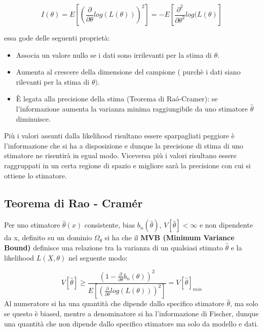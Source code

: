 \begin{equation*}
		I(\theta) = E[(\frac{\partial}{\partial \theta}log(L(\theta)))^2] = -E[\frac{\partial^2}{\partial\theta^2}log(L(\theta)]
\end{equation*}

\noindent essa gode delle seguenti propriet\`{a}:

\begin{itemize}
	\item Associa un valore nullo se i dati sono irrilevanti per la stima di $\theta$.
	\item Aumenta al crescere della dimensione del campione ( purch\`{e} i dati siano rilevanti per la stima di $\theta)$.
	\item \`{E} legata alla precisione della stima (Teorema di Ra\'{o}-Cramer): se l'informazione aumenta la varianza minima raggiungibile da uno stimatore $\hat{\theta}$ diminuisce.
\end{itemize}

\noindent Pi\`{u} i valori assunti dalla likelihood risultano essere sparpagliati peggiore \`{e} l'informazione che si ha a disposizione e dunque la precisione di stima di uno stimatore ne risentir\`{a} in egual modo. Viceversa pi\`{u} i valori risultano essere raggruppati in un certa regione di spazio e migliore sar\`{a} la precisione con cui si ottiene lo stimatore.

\subsection{Teorema di Rao - Cram\'{e}r}

Per uno stimatore $\hat{\theta}(x)$ consistente, bias $b_n(\hat{\theta})$, $V[\hat{\theta}] < \infty$ e non dipendente da x, definito su un dominio $\Omega_{\theta}$ si ha che il \textbf{MVB (Minimum Variance Bound)} definisce una relazione tra la varianza di un qualsiasi stimato $\hat{\theta}$ e la likelihood $L(\underline{X},\theta)$ nel seguente modo:

\begin{equation}
	V[\hat{\theta}] \geq \frac{(1-\frac{\partial}{\partial \theta}b_n(\theta))^2}{E[(\frac{\partial}{\partial \theta}log(L(\theta)))^2]} = V[\hat{\theta}]_{min}
\end{equation}
\newline
\noindent Al numeratore si ha una quantit\`{a} che dipende dallo specifico stimatore $\hat{\theta}$, ma solo se questo \`{e} biased, mentre a denominatore si ha l'informazione di Fischer, dunque una quantit\`{a} che non dipende dallo specifico stimatore ma solo da modello e dati.
\newline

